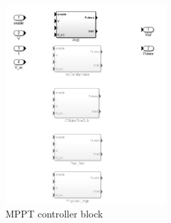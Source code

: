 \begin{figure}[H]
  \begin{center}
	  \includegraphics[width=0.55\textwidth]{images/controller_mod}
	  \caption{MPPT controller block}
	  \label{fig:Controller_mod}
  \end{center}
\end{figure}


